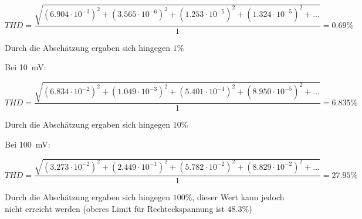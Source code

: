 \begin{equation*}
    THD = \frac{\sqrt{(6.904\cdot10^{-3})^2 + (3.565\cdot10^{-6})^2 + (1.253\cdot10^{-5})^2 +(1.324\cdot10^{-5})^2 + \ldots}}{1} = 0.69 \%
\end{equation*}

Durch die Abschätzung ergaben sich hingegen $1\%$

Bei \SI{10}{\milli \volt}:

\begin{equation*}
    THD = \frac{\sqrt{(6.834\cdot10^{-2})^2 + (1.049\cdot10^{-3})^2 + (5.401\cdot10^{-4})^2 +(8.950\cdot10^{-5})^2 + \ldots}}{1} = 6.835 \%
\end{equation*}

Durch die Abschätzung ergaben sich hingegen $10\%$

Bei \SI{100}{\milli \volt}:

\begin{equation*}
    THD = \frac{\sqrt{(3.273\cdot10^{-2})^2 + (2.449\cdot10^{-1})^2 + (5.782\cdot10^{-2})^2 +(8.829\cdot10^{-2})^2 + \ldots}}{1} = 27.95 \%
\end{equation*}

Durch die Abschätzung ergaben sich hingegen $100\%$, dieser Wert kann jedoch nicht erreicht werden (oberes Limit für Rechteckspannung ist $48.3 \%$)